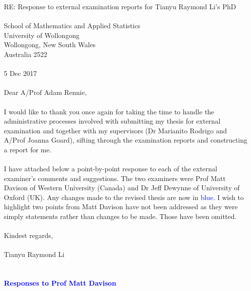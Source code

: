 \documentclass{article}
\begin{document}
RE: Response to external examination reports for Tianyu Raymond Li's PhD
\\
\\
School of Mathematics and Applied Statistics \\
University of Wollongong \\
Wollongong, New South Wales \\
Australia 2522
\\
\\
5 Dec 2017
\\
\\
Dear A/Prof Adam Rennie,
\\
\\
I would like to thank you once again for taking the time to handle the administrative processes involved with submitting my thesis for external examination and together with my supervisors (Dr Marianito Rodrigo and A/Prof Joanna Goard), sifting through the examination reports and constructing a report for me. 
\\
\\
I have attached below a point-by-point response to each of the external examiner's comments and suggestions. The two examiners were Prof Matt Davison of Western University (Canada) and Dr Jeff Dewynne of University of Oxford (UK). Any changes made to the revised thesis are now in \textcolor{blue}{blue}. I wish to highlight two points from Matt Davison have not been addressed as they were simply statements rather than changes to be made. Those have been omitted.
\\
\\
Kindest regards,
\\
\\
Tianyu Raymond Li
\\
\\
\\
\textcolor{blue}{\textbf{Responses to Prof Matt Davison\\ \\}}
\end{document}
